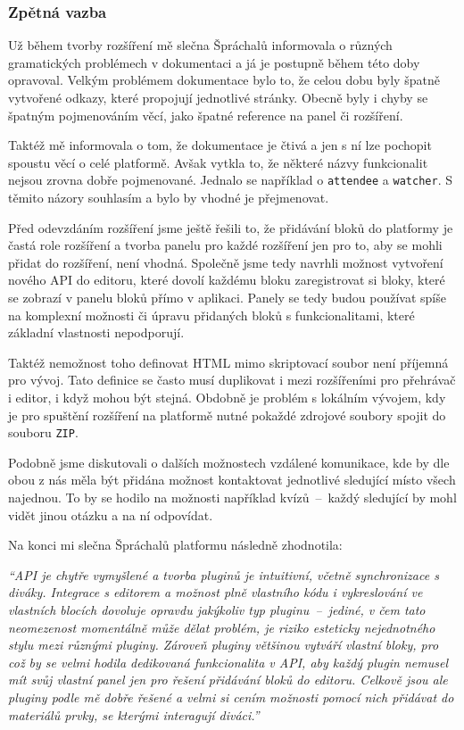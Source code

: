 \subsubsection{Zpětná vazba}

Už během tvorby rozšíření mě slečna Špráchalů informovala o různých gramatických problémech v dokumentaci a já je postupně během této doby opravoval.
Velkým problémem dokumentace bylo to, že celou dobu byly špatně vytvořené odkazy, které propojují jednotlivé stránky.
Obecně byly i chyby se špatným pojmenováním věcí, jako špatné reference na panel či rozšíření.

Taktéž mě informovala o tom, že dokumentace je čtivá a jen s ní lze pochopit spoustu věcí o celé platformě.
Avšak vytkla to, že některé názvy funkcionalit nejsou zrovna dobře pojmenované. 
Jednalo se například o \verb|attendee| a \verb|watcher|.
S těmito názory souhlasím a bylo by vhodné je přejmenovat. 

Před odevzdáním rozšíření jsme ještě řešili to, že přidávání bloků do platformy je častá role rozšíření a tvorba panelu pro každé rozšíření jen pro to, aby se mohli přidat do rozšíření, není vhodná.
Společně jsme tedy navrhli možnost vytvoření nového API do editoru, které dovolí každému bloku zaregistrovat si bloky, které se zobrazí v panelu bloků přímo v aplikaci.
Panely se tedy budou používat spíše na komplexní možnosti či úpravu přidaných bloků s funkcionalitami, které základní vlastnosti nepodporují.

Taktéž nemožnost toho definovat HTML mimo skriptovací soubor není příjemná pro vývoj.
Tato definice se často musí duplikovat i mezi rozšířeními pro přehrávač i editor, i když mohou být stejná.
Obdobně je problém s lokálním vývojem, kdy je pro spuštění rozšíření na platformě nutné pokaždé zdrojové soubory spojit do souboru \verb|ZIP|.


Podobně jsme diskutovali o dalších možnostech vzdálené komunikace, kde by dle obou z nás měla být přidána možnost kontaktovat jednotlivé sledující místo všech najednou.
To by se hodilo na možnosti například kvízů~--~každý sledující by mohl vidět jinou otázku a na ní odpovídat.

Na konci mi slečna Špráchalů platformu následně zhodnotila:

\vspace{1em}

\textit{\enquote{API je chytře vymyšlené a tvorba pluginů je intuitivní, včetně synchronizace s diváky. Integrace s editorem a možnost plně vlastního kódu i vykreslování ve vlastních blocích dovoluje opravdu jakýkoliv typ pluginu~--~jediné, v čem tato neomezenost momentálně může dělat problém, je riziko esteticky nejednotného stylu mezi různými pluginy. Zároveň pluginy většinou vytváří vlastní bloky, pro což by se velmi hodila dedikovaná funkcionalita v API, aby každý plugin nemusel mít svůj vlastní panel jen pro řešení přidávání bloků do editoru.
Celkově jsou ale pluginy podle mě dobře řešené a velmi si cením možnosti pomocí nich přidávat do materiálů prvky, se kterými interagují diváci.}}


